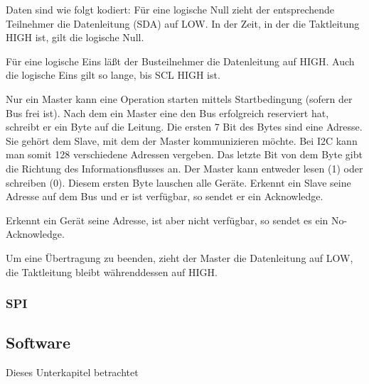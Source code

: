 
Daten sind wie folgt kodiert: Für eine logische Null zieht der entsprechende Teilnehmer die Datenleitung (SDA) auf LOW. In der Zeit, in der die Taktleitung HIGH ist, gilt die logische Null. 


Für eine logische Eins läßt der Busteilnehmer die Datenleitung auf HIGH. Auch die logische Eins gilt so lange, bis SCL HIGH ist. 


Nur ein Master kann eine Operation starten mittels Startbedingung (sofern der Bus frei ist). Nach dem ein Master eine den Bus erfolgreich reserviert hat, schreibt er ein Byte auf die Leitung. Die ersten 7 Bit des Bytes sind eine Adresse. Sie gehört dem Slave, mit dem der Master kommunizieren möchte. Bei \ac{I2C}  kann man somit 128 verschiedene Adressen vergeben. Das letzte Bit von dem Byte gibt die Richtung des Informationsflusses an. Der Master kann entweder lesen (1) oder schreiben (0). Diesem ersten Byte lauschen alle Geräte. Erkennt ein Slave seine Adresse auf dem Bus und er ist verfügbar, so sendet er ein Acknowledge.


Erkennt ein Gerät seine Adresse, ist aber nicht verfügbar, so sendet es ein No-Acknowledge.


Um eine Übertragung zu beenden, zieht der Master die Datenleitung auf LOW, die Taktleitung bleibt währenddessen auf HIGH. 


\subsubsection{\ac{SPI}}

 




 
\subsection{Software}
Dieses Unterkapitel betrachtet 
 





          
 
